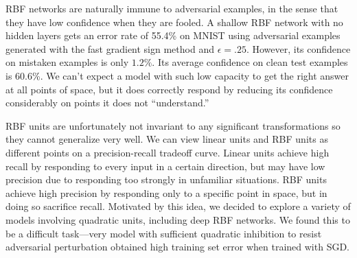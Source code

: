 \documentclass{article} %
\def\eps{{\epsilon}}
\def\vw{{\bm{w}}}
\def\vx{{\bm{x}}}
\def\mU{{\bm{U}}}
\def\mV{{\bm{V}}}
\begin{document}
RBF networks are naturally immune to adversarial examples, in the sense that they have low
confidence when they are fooled. A shallow RBF network with no hidden layers gets an error
rate of 55.4\% on MNIST using adversarial examples generated with the fast gradient sign
method and $\eps = .25$. However, its confidence on mistaken examples is only $1.2\%$.
Its average confidence on clean test examples is $60.6$\%.
We can't expect a model with such low capacity to get the right answer at all points of space,
but it does correctly respond by reducing its confidence considerably on points it does not
``understand.''

RBF units are unfortunately not invariant to any significant transformations
so they cannot generalize very well. We can view linear units and RBF units as different points on
a precision-recall tradeoff curve. Linear units achieve high recall by responding to every input in
a certain direction, but may have low precision due to responding too strongly in unfamiliar situations.
RBF units achieve high precision by responding only to a specific point in space, but in doing so
sacrifice recall. Motivated by this idea, we decided to explore a variety of models involving quadratic units,
including deep RBF networks. We found this to be a difficult task---very model with sufficient
quadratic inhibition to resist adversarial perturbation obtained high training set error when trained
with SGD.
%
\end{document}
